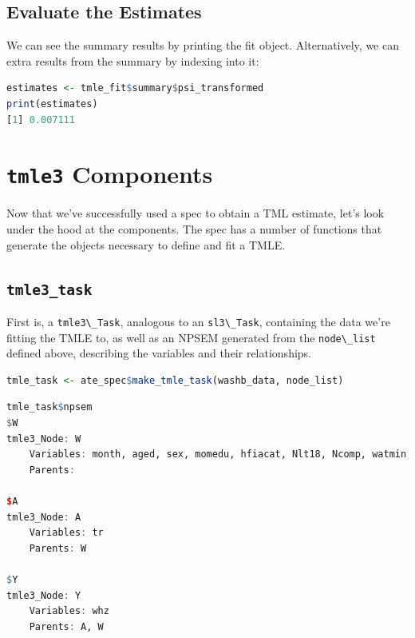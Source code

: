 \documentclass[
  12pt, krantz2,
]{krantz}
\newcommand{\passthrough}[1]{#1}
\newcommand{\1}{\mathbbm{1}}
\theoremstyle{definition}
\theoremstyle{definition}
\theoremstyle{definition}
\theoremstyle{definition}
\theoremstyle{remark}
\begin{document}
\hypertarget{evaluate-the-estimates}{%
\subsection{Evaluate the Estimates}\label{evaluate-the-estimates}}

We can see the summary results by printing the fit object. Alternatively, we
can extra results from the summary by indexing into it:

\begin{lstlisting}[language=R]
estimates <- tmle_fit$summary$psi_transformed
print(estimates)
[1] 0.007111
\end{lstlisting}

\hypertarget{tmle3-components}{%
\section{\texorpdfstring{\texttt{tmle3} Components}{tmle3 Components}}\label{tmle3-components}}

Now that we've successfully used a spec to obtain a TML estimate, let's look
under the hood at the components. The spec has a number of functions that
generate the objects necessary to define and fit a TMLE.

\hypertarget{tmle3_task}{%
\subsection{\texorpdfstring{\texttt{tmle3\_task}}{tmle3\_task}}\label{tmle3_task}}

First is, a \passthrough{\lstinline!tmle3\_Task!}, analogous to an \passthrough{\lstinline!sl3\_Task!}, containing the data we're
fitting the TMLE to, as well as an NPSEM generated from the \passthrough{\lstinline!node\_list!}
defined above, describing the variables and their relationships.

\begin{lstlisting}[language=R]
tmle_task <- ate_spec$make_tmle_task(washb_data, node_list)
\end{lstlisting}

\begin{lstlisting}[language=R]
tmle_task$npsem
$W
tmle3_Node: W
    Variables: month, aged, sex, momedu, hfiacat, Nlt18, Ncomp, watmin, elec, floor, walls, roof, asset_wardrobe, asset_table, asset_chair, asset_khat, asset_chouki, asset_tv, asset_refrig, asset_bike, asset_moto, asset_sewmach, asset_mobile, momage, momheight, delta_momage, delta_momheight
    Parents: 

$A
tmle3_Node: A
    Variables: tr
    Parents: W

$Y
tmle3_Node: Y
    Variables: whz
    Parents: A, W
\end{lstlisting}
\end{document}
